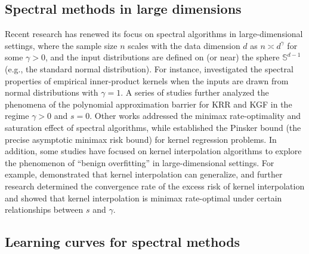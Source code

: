 \documentclass{article}
\theoremstyle{plain}
\theoremstyle{definition}
\theoremstyle{remark}
\begin{document}
\subsection{Spectral methods in large dimensions}
Recent research has renewed its focus on spectral algorithms in large-dimensional settings, where the sample size $n$ scales with the data dimension $d$ as $n \asymp d^{\gamma}$ for some $\gamma > 0$, and the input distributions are defined on (or near) the sphere  $\mathbb{S}^{d-1}$ (e.g., the standard normal distribution).
For instance, \cite{Karoui_spectrum_2010} investigated the spectral properties of empirical inner-product kernels when the inputs are drawn from normal distributions with $\gamma = 1$. A series of studies \citep{Liang_Just_2019, liang2020multiple, Ghorbani_When_2021, ghorbani2021linearized, mei2021learning, mei2022generalization, misiakiewicz_learning_2021, aerni2023strong, barzilai2023generalization, Ghosh_three_2021} further analyzed the phenomena of the polynomial approximation barrier for KRR and KGF in the regime $\gamma>0$ and $s=0$. Other works \citep{lu2023optimal, zhang2024optimal, lu2024saturation} addressed the minimax rate-optimality and saturation effect of spectral algorithms, while \cite{lu2024pinsker} established the Pinsker bound (the precise asymptotic minimax risk bound) for kernel regression problems. 
In addition, some studies have focused on kernel interpolation algorithms to explore the phenomenon of ``benign overfitting'' in large-dimensional settings. For example,  \cite{Liang_Just_2019} demonstrated that kernel interpolation can generalize, and further research \citep{liang2020multiple, aerni2023strong, barzilai2023generalization, zhang2024phase} determined the convergence rate of the excess risk of kernel interpolation and showed that kernel interpolation is minimax rate-optimal under certain relationships between $s$ and $\gamma$.

\subsection{Learning curves for spectral methods}
\end{document}
